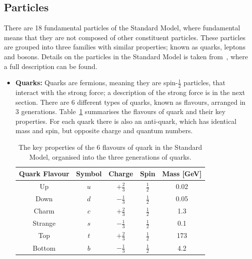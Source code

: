 \subsection{Particles}
\label{theo-sm_particles}

There are 18 fundamental particles of the Standard Model,
where fundamental means that they are not composed of other constituent particles.
These particles are grouped into three families with similar properties;
known as quarks, leptons and bosons.
Details on the particles in the Standard Model is taken from~\cite{obj-bjets_PDG}, where a full description can be found.

\begin{itemize}[leftmargin=*]
\item\textbf{Quarks:}
  Quarks are fermions, meaning they are spin-$\frac{1}{2}$ particles,
  that interact with the strong force; a description of the strong force is in the next section.
  There are 6 different types of quarks, known as flavours, arranged in 3 generations.
  Table~\ref{tab:theo-sm_quarks} summarises the flavours of quark and their key properties.
  For each quark there is also an anti-quark, which has identical mass and spin, but opposite charge and quantum numbers.
  {\renewcommand{\arraystretch}{1.5}
  \begin{table}[!ht]
  \begin{center}
    \begin{tabular}{|c||c|c|c|c|}
      \hline
    Quark Flavour & Symbol & Charge            &  Spin           &  Mass [GeV]\\
    \hline
    Up            &   $u$  &  $+\frac{2}{3}$   &  $\frac{1}{2}$  &  0.02\\
    Down          &   $d$  &  $-\frac{1}{3}$   &  $\frac{1}{2}$  &  0.05\\
    \hline                                                   
    Charm         &   $c$  &  $+\frac{2}{3}$   &  $\frac{1}{2}$  &  1.3 \\
    Strange       &   $s$  &  $-\frac{1}{3}$   &  $\frac{1}{2}$  &  0.1 \\
    \hline                                                      
    Top           &   $t$  &  $+\frac{2}{3}$   &  $\frac{1}{2}$  &  173  \\
    Bottom        &   $b$  &  $-\frac{1}{3}$   &  $\frac{1}{2}$  &  4.2  \\
    \hline  
  \end{tabular}
    \caption{The key properties of the 6 flavours of quark in the Standard Model,
    organised into the three generations of quarks.}
  \label{tab:theo-sm_quarks}
  \end{center}
  \end{table}}


\end{itemize}
